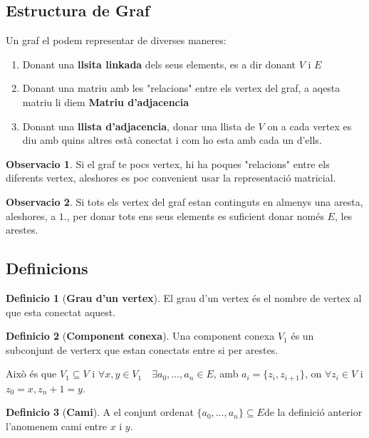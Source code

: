 \documentclass[12pt]{article}
\theoremstyle{definition}
\newtheorem{definicio}{Definicio}
\theoremstyle{definition}
\theoremstyle{definition}
\newtheorem{obs}{Observacio}
\theoremstyle{definition}
\theoremstyle{definition}
\theoremstyle{definition}
\theoremstyle{definition}
\begin{document}
\subsection{Estructura de Graf}
Un graf el podem representar de diverses maneres:
\begin{enumerate}
	\item Donant una \textbf{llsita linkada} dels seus elements, es a dir donant $V$ i $E$
	\item Donant una matriu amb les "relacions" entre els vertex del graf, a aqesta matriu li diem \textbf{Matriu d'adjacencia}
	\item Donant una \textbf{llista d'adjacencia}, donar una llista de $V$ on a cada vertex es diu amb quins altres està conectat i com ho esta amb cada un d'ells.
\end{enumerate}

\begin{obs}
Si el graf te pocs vertex, hi ha poques "relacions" entre els diferents vertex, aleshores es poc convenient usar la representació matricial.
\end{obs}

\begin{obs}
Si tots els vertex del graf estan continguts en almenys una aresta, aleshores, a $1.$, per donar tots ens seus elements es suficient donar només $E$, les arestes.
\end{obs}

\subsection{Definicions}

\begin{definicio}[\textbf{Grau d'un vertex}]
El grau d'un vertex és el nombre de vertex al que esta conectat aquest.
\end{definicio}

\begin{definicio}[\textbf{Component conexa}]
Una component conexa $V_1$ és un subconjunt de verterx que estan conectats entre si per arestes.

Això és que $V_1\subseteq V$ i $\forall x,y\in V_1 \quad\exists a_0,\dots,a_n\in E$, amb $a_i=\{z_i,z_{i+1}\}$, on $\forall z_i\in V$ i $z_0=x,z_n+1=y$.
\end{definicio}

\begin{definicio}[\textbf{Cami}]
A el conjunt ordenat $\{a_0,\dots,a_n\}\subseteq E$de la definició anterior l'anomenem cami entre $x$ i $y$.
\end{definicio}
\end{document}

